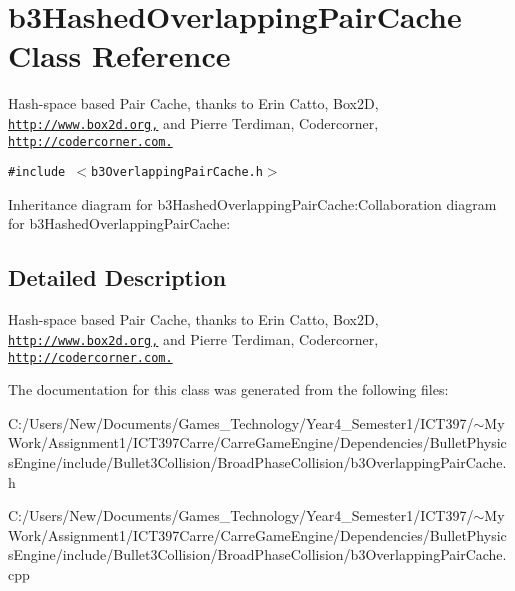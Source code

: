 \hypertarget{classb3_hashed_overlapping_pair_cache}{
\section{b3HashedOverlappingPairCache Class Reference}
\label{classb3_hashed_overlapping_pair_cache}
}
Hash-space based Pair Cache, thanks to Erin Catto, Box2D, \href{http://www.box2d.org,}{\tt http://www.box2d.org,} and Pierre Terdiman, Codercorner, \href{http://codercorner.com.}{\tt http://codercorner.com.}  


{\tt \#include $<$b3OverlappingPairCache.h$>$}

Inheritance diagram for b3HashedOverlappingPairCache:Collaboration diagram for b3HashedOverlappingPairCache:

\subsection{Detailed Description}
Hash-space based Pair Cache, thanks to Erin Catto, Box2D, \href{http://www.box2d.org,}{\tt http://www.box2d.org,} and Pierre Terdiman, Codercorner, \href{http://codercorner.com.}{\tt http://codercorner.com.} 

The documentation for this class was generated from the following files:\begin{CompactItemize}
\item 
C:/Users/New/Documents/Games\_\-Technology/Year4\_\-Semester1/ICT397/$\sim$My Work/Assignment1/ICT397Carre/CarreGameEngine/Dependencies/BulletPhysicsEngine/include/Bullet3Collision/BroadPhaseCollision/b3OverlappingPairCache.h\item 
C:/Users/New/Documents/Games\_\-Technology/Year4\_\-Semester1/ICT397/$\sim$My Work/Assignment1/ICT397Carre/CarreGameEngine/Dependencies/BulletPhysicsEngine/include/Bullet3Collision/BroadPhaseCollision/b3OverlappingPairCache.cpp\end{CompactItemize}
